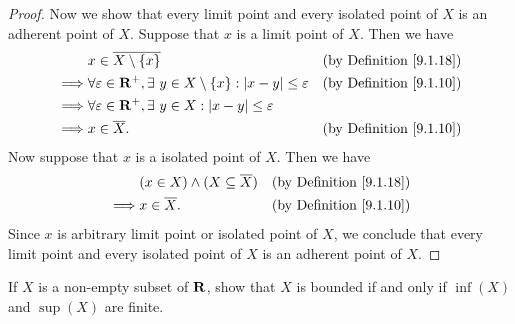 \begin{proof}
    Now we show that every limit point and every isolated point of \(X\) is an adherent point of \(X\).
    Suppose that \(x\) is a limit point of \(X\).
    Then we have
    \begin{align*}
                 & x \in \overline{X \setminus \{x\}}                                                            & \text{(by Definition \ref{9.1.18})} \\
        \implies & \forall \varepsilon \in \mathbf{R}^+, \exists\ y \in X \setminus \{x\} : \left\lvert x - y\right\rvert \leq \varepsilon & \text{(by Definition \ref{9.1.10})} \\
        \implies & \forall \varepsilon \in \mathbf{R}^+, \exists\ y \in X : \left\lvert x - y\right\rvert \leq \varepsilon                                                       \\
        \implies & x \in \overline{X}.                                                                           & \text{(by Definition \ref{9.1.10})}
    \end{align*}
    Now suppose that \(x\) is a isolated point of \(X\).
    Then we have
    \begin{align*}
                 & (x \in X) \land (X \subseteq \overline{X}) & \text{(by Definition \ref{9.1.18})} \\
        \implies & x \in \overline{X}.                        & \text{(by Definition \ref{9.1.10})}
    \end{align*}
    Since \(x\) is arbitrary limit point or isolated point of \(X\), we conclude that every limit point and every isolated point of \(X\) is an adherent point of \(X\).
\end{proof}

\begin{exercise}\label{ex 9.1.10}
    If \(X\) is a non-empty subset of \(\mathbf{R}\), show that \(X\) is bounded if and only if \(\inf(X)\) and \(\sup(X)\) are finite.
\end{exercise}

